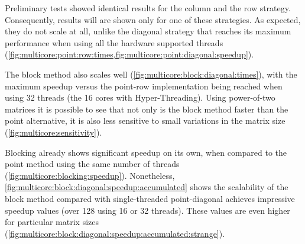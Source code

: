 \documentclass[../thesis]{subfiles}
\begin{document}
	Preliminary tests showed identical results for the column and the row strategy. Consequently, results will are shown only for one of these strategies. As expected, they do not scale at all, unlike the diagonal strategy that reaches its maximum performance when using all the hardware supported threads (\cref{fig:multicore:point:row:times,fig:multicore:point:diagonal:speedup}).

	The block method also scales well (\cref{fig:multicore:block:diagonal:times}), with the maximum speedup versus the point-row implementation being reached when using 32 threads (the 16 cores with Hyper-Threading). Using power-of-two matrices it is possible to see that not only is the block method faster than the point alternative, it is also less sensitive to small variations in the matrix size (\cref{fig:multicore:sensitivity}).


	Blocking already shows significant speedup on its own, when compared to the point method using the same number of threads (\cref{fig:multicore:blocking:speedup}). Nonetheless, \cref{fig:multicore:block:diagonal:speedup:accumulated} shows the scalability of the block method compared with single-threaded point-diagonal achieves impressive speedup values (over 128 using 16 or 32 threads). These values are even higher for particular matrix sizes (\cref{fig:multicore:block:diagonal:speedup:accumulated:strange}).
\end{document}
